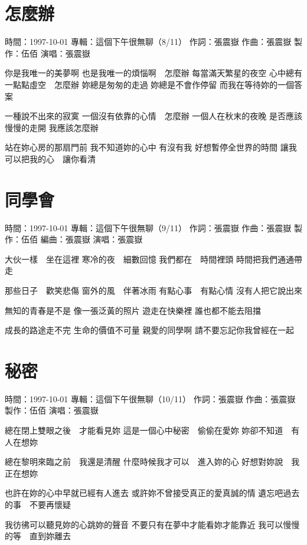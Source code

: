 \documentclass[UTF8,a4paper,oneside,twocolumn,12pt]{ctexbook}
\newcommand{\infopair}[2]{\textbullet #1：#2}
\newcommand{\zc}[1][伍佰]{\infopair{作詞}{#1}}
\newcommand{\zq}[1][伍佰]{\infopair{作曲}{#1}}
\newcommand{\bq}[1][伍佰]{\infopair{編曲}{#1}}
\newcommand{\zj}[1]{\infopair{專輯}{#1}}
\newcommand{\zz}[1]{\infopair{製作}{#1}}
\newcommand{\sj}[1]{\infopair{時間}{#1}}
\newenvironment{info}{\begin{flushleft}\kaishu
	}
	{\end{flushleft}\normalsize\yahei\par}
\newenvironment{lyric}{
	}
{}
\begin{document}
\section{怎麼辦}
\begin{info}
	\sj{1997-10-01}
	\zj{這個下午很無聊（8/11）}
	\zc[張震嶽]
	\zq[張震嶽]
	\zz{伍佰}
	\infopair{演唱}{張震嶽}
\end{info}
\begin{lyric}
	你是我唯一的美夢啊
	也是我唯一的煩惱啊　怎麼辦
	每當滿天繁星的夜空
	心中總有一點點虛空　怎麼辦
	妳總是匆匆的走過
	妳總是不會作停留
	而我在等待妳的一個答案

	一種說不出來的寂寞
	一個沒有依靠的心情　怎麼辦
	一個人在秋末的夜晚
	是否應該慢慢的走開
	我應該怎麼辦

	站在妳心房的那扇門前
	我不知道妳的心中 有沒有我
	好想暫停全世界的時間
	讓我可以把我的心　讓你看清
\end{lyric}

\section{同學會}
\begin{info}
	\sj{1997-10-01}
	\zj{這個下午很無聊（9/11）}
	\zc[張震嶽]
	\zq[張震嶽]
	\zz{伍佰}
	\bq[張震嶽]
	\infopair{演唱}{張震嶽}
\end{info}
\begin{lyric}
	大伙一樣　坐在這裡
	寒冷的夜　細數回憶
	我們都在　時間裡頭
	時間把我們通通帶走

	那些日子　歡笑悲傷
	窗外的風　伴著冰雨
	有點心事　有點心情
	沒有人把它說出來

	無知的青春是不是
	像一張泛黃的照片
	遊走在快樂裡
	誰也都不能去阻擋

	成長的路途走不完
	生命的價值不可量
	親愛的同學啊
	請不要忘記你我曾經在一起
\end{lyric}

\section{秘密}
\begin{info}
	\sj{1997-10-01}
	\zj{這個下午很無聊（10/11）}
	\zc[張震嶽]
	\zq[張震嶽]
	\zz{伍佰}
	\infopair{演唱}{張震嶽}
\end{info}
\begin{lyric}
	總在閉上雙眼之後　才能看見妳
	這是一個心中秘密　偷偷在愛妳
	妳卻不知道　有人在想妳

	總在黎明來臨之前　我還是清醒
	什麼時候我才可以　進入妳的心
	好想對妳說　我正在想妳

	也許在妳的心中早就已經有人進去
	或許妳不曾接受真正的愛真誠的情
	遺忘吧過去的事　不要再懷疑

	我彷彿可以聽見妳的心跳妳的聲音
	不要只有在夢中才能看妳才能靠近
	我可以慢慢的等　直到妳離去
\end{lyric}
\end{document}
